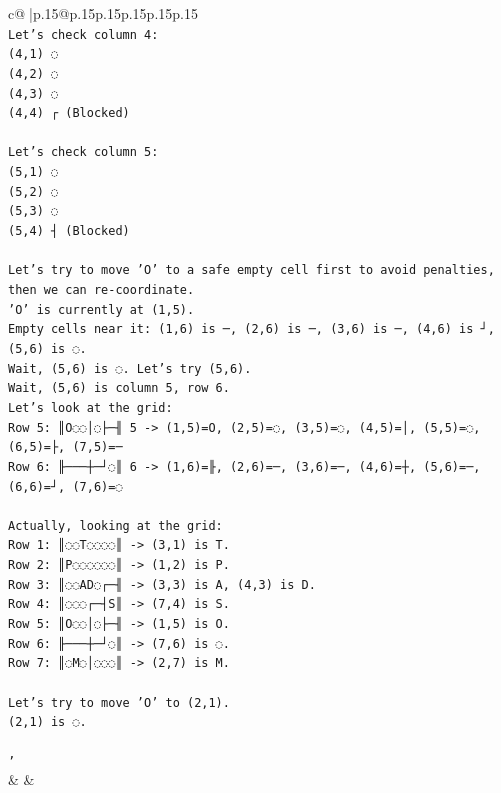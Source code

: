 \documentclass{article}
\begin{document}
{\begin{supertabular}{c@{$\;$}|p{.15\linewidth}@{}p{.15\linewidth}p{.15\linewidth}p{.15\linewidth}p{.15\linewidth}p{.15\linewidth}}
{{{\\ 
\texttt{Let's check column 4:} \\
\texttt{(4,1) ◌} \\
\texttt{(4,2) ◌} \\
\texttt{(4,3) ◌} \\
\texttt{(4,4) ┌ (Blocked)} \\
\\ 
\texttt{Let's check column 5:} \\
\texttt{(5,1) ◌} \\
\texttt{(5,2) ◌} \\
\texttt{(5,3) ◌} \\
\texttt{(5,4) ┤ (Blocked)} \\
\\ 
\texttt{Let's try to move 'O' to a safe empty cell first to avoid penalties, then we can re{-}coordinate.} \\
\texttt{'O' is currently at (1,5).} \\
\texttt{Empty cells near it: (1,6) is ─, (2,6) is ─, (3,6) is ─, (4,6) is ┘, (5,6) is ◌.} \\
\texttt{Wait, (5,6) is ◌. Let's try (5,6).} \\
\texttt{Wait, (5,6) is column 5, row 6.} \\
\texttt{Let's look at the grid:} \\
\texttt{Row 5: ║O◌◌│◌├─╢ 5 {-}> (1,5)=O, (2,5)=◌, (3,5)=◌, (4,5)=│, (5,5)=◌, (6,5)=├, (7,5)=─} \\
\texttt{Row 6: ╟───┼─┘◌║ 6 {-}> (1,6)=╟, (2,6)=─, (3,6)=─, (4,6)=┼, (5,6)=─, (6,6)=┘, (7,6)=◌} \\
\\ 
\texttt{Actually, looking at the grid:} \\
\texttt{Row 1: ║◌◌T◌◌◌◌║ {-}> (3,1) is T.} \\
\texttt{Row 2: ║P◌◌◌◌◌◌║ {-}> (1,2) is P.} \\
\texttt{Row 3: ║◌◌AD◌┌─╢ {-}> (3,3) is A, (4,3) is D.} \\
\texttt{Row 4: ║◌◌◌┌─┤S║ {-}> (7,4) is S.} \\
\texttt{Row 5: ║O◌◌│◌├─╢ {-}> (1,5) is O.} \\
\texttt{Row 6: ╟───┼─┘◌║ {-}> (7,6) is ◌.} \\
\texttt{Row 7: ║◌M◌│◌◌◌║ {-}> (2,7) is M.} \\
\\ 
\texttt{Let's try to move 'O' to (2,1).} \\
\texttt{(2,1) is ◌.} \\
\\ 
\texttt{'} \\
            }
        }
    }
    & & \\ \\


\end{supertabular}}
\end{document}
